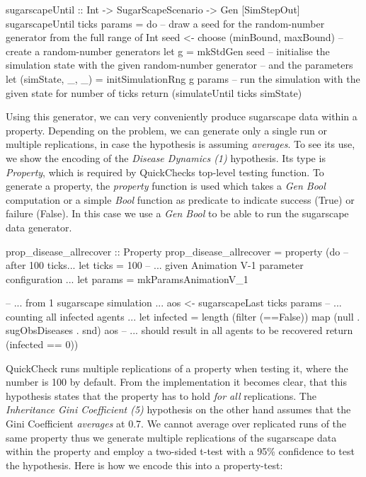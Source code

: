 \begin{HaskellCode}
sugarscapeUntil :: Int -> SugarScapeScenario -> Gen [SimStepOut]
sugarscapeUntil ticks params = do
  -- draw a seed for the random-number generator from the full range of Int
  seed <- choose (minBound, maxBound)
  -- create a random-number generators
  let g = mkStdGen seed
  -- initialise the simulation state with the given random-number generator
  -- and the parameters
  let (simState, _, _) = initSimulationRng g params
  -- run the simulation with the given state for number of ticks
  return (simulateUntil ticks simState)
\end{HaskellCode}

Using this generator, we can very conveniently produce sugarscape data within a property. Depending on the problem, we can generate only a single run or multiple replications, in case the hypothesis is assuming \textit{averages}. To see its use, we show the encoding of the \textit{Disease Dynamics (1)} hypothesis. Its type is \textit{Property}, which is required by QuickChecks top-level testing function. To generate a property, the \textit{property} function is used which takes a \textit{Gen Bool} computation or a simple \textit{Bool} function as predicate to indicate success (True) or failure (False). In this case we use a \textit{Gen Bool} to be able to run the sugarscape data generator.

\begin{HaskellCode}
prop_disease_allrecover :: Property
prop_disease_allrecover = property (do
  -- after 100 ticks...
  let ticks  = 100
  -- ... given Animation V-1 parameter configuration ...
  let params = mkParamsAnimationV_1

  -- ... from 1 sugarscape simulation ...
  aos <- sugarscapeLast ticks params
  -- ... counting all infected agents ...
  let infected = length (filter (==False)) map (null . sugObsDiseases . snd) aos
  -- ... should result in all agents to be recovered
  return (infected == 0))
\end{HaskellCode}

QuickCheck runs multiple replications of a property when testing it, where the number is 100 by default. From the implementation it becomes clear, that this hypothesis states that the property has to hold \textit{for all} replications. The \textit{Inheritance Gini Coefficient (5)} hypothesis on the other hand assumes that the Gini Coefficient \textit{averages} at 0.7. We cannot average over replicated runs of the same property thus we generate multiple replications of the sugarscape data within the property and employ a two-sided t-test with a 95\% confidence to test the hypothesis. Here is how we encode this into a property-test:


